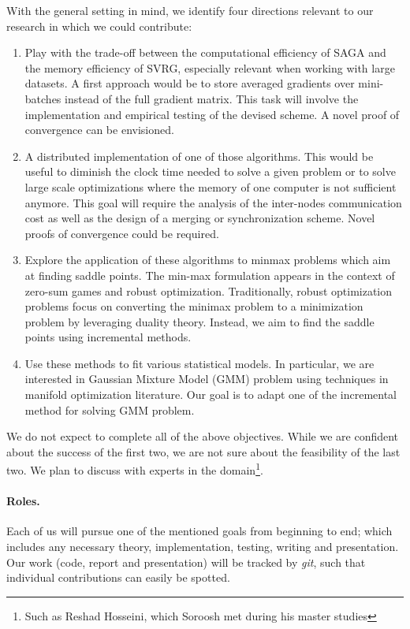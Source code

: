 \documentclass[a4paper,11pt]{article}
\begin{document}
With the general setting in mind, we identify four directions relevant to our
research in which we could contribute:
\begin{enumerate}
	\item Play with the trade-off between the computational efficiency of SAGA
		and the memory efficiency of SVRG, especially relevant when working with
		large datasets. A first approach would be to store averaged gradients
		over mini-batches instead of the full gradient matrix. This task will
		involve the implementation and empirical testing of the devised scheme.
		A novel proof of convergence can be envisioned.
	\item A distributed implementation of one of those algorithms. This would be
		useful to diminish the clock time needed to solve a given problem or to
		solve large scale optimizations where the memory of one computer is not
		sufficient anymore. This goal will require the analysis of the
		inter-nodes communication cost as well as the design of a merging or
		synchronization scheme. Novel proofs of convergence could be required.
	\item Explore the application of these algorithms to minmax problems which
		aim at finding saddle points. The min-max formulation appears in the context of zero-sum games and robust optimization. Traditionally, robust optimization problems focus on converting the minimax problem to a minimization problem by leveraging duality theory. Instead, we aim to find the saddle points using incremental methods.
	\item Use these methods to fit various statistical models. In particular, we are interested in Gaussian Mixture Model (GMM) problem using techniques in manifold optimization literature. Our goal is to adapt one of the incremental method for solving GMM problem. 
\end{enumerate}

We do not expect to complete all of the above objectives. While we are confident
about the success of the first two, we are not sure about the feasibility of the
last two. We plan to discuss with experts in the domain\footnote{Such as Reshad
Hosseini, which Soroosh met during his master studies}.

\paragraph{Roles.}
Each of us will pursue one of the mentioned goals from beginning to end; which
includes any necessary theory, implementation, testing, writing and
presentation. Our work (code, report and presentation) will be tracked by
\textit{git}, such that individual contributions can easily be spotted.
\end{document}
